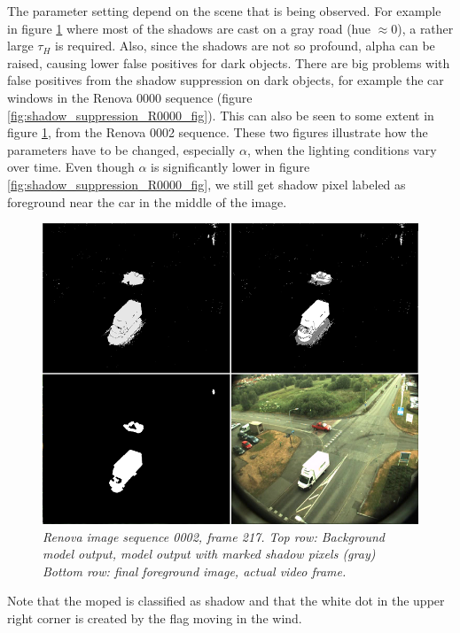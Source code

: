 The parameter setting depend on the scene that is being observed. For example in figure \ref{fig:shadow_suppression_R0002_fig} where most of the shadows are cast on a gray road (hue $\approx 0$), a rather large $\tau_H$ is required. Also, since the shadows are not so profound, alpha can be raised, causing lower false positives for dark objects. There are big problems with false positives from the shadow suppression on dark objects, for example the car windows in the Renova 0000 sequence (figure \ref{fig:shadow_suppression_R0000_fig}). This can also be seen to some extent in figure \ref{fig:shadow_suppression_R0002_fig}, from the Renova 0002 sequence. These two figures illustrate how the parameters have to be changed, especially $\alpha$, when the lighting conditions vary over time. Even though $\alpha$ is significantly lower in figure \ref{fig:shadow_suppression_R0000_fig}, we still get shadow pixel labeled as foreground near the car in the middle of the image.

\newpage
\begin{figure}[htb]
	\centering
	\includegraphics[width=\linewidth]{images/ShadowRenova0002.png}
	\caption{\textit{Renova image sequence 0002, frame 217. 
	\newline
	Top row: Background model output, model output with marked shadow pixels (gray) \newline
	Bottom row: final foreground image, actual video frame.}}
	\label{fig:shadow_suppression_R0002_fig}  %
\end{figure}
Note that the moped is classified as shadow and that the white dot in the upper right corner is created by the flag moving in the wind.\\

